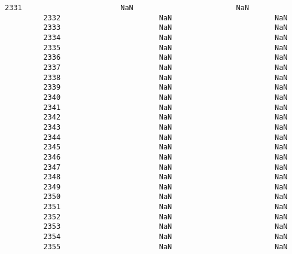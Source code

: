 \documentclass[11pt]{article}
\begin{document}
\begin{Verbatim}[commandchars=\\\{\}]
         2331                       NaN                        NaN   
         2332                       NaN                        NaN   
         2333                       NaN                        NaN   
         2334                       NaN                        NaN   
         2335                       NaN                        NaN   
         2336                       NaN                        NaN   
         2337                       NaN                        NaN   
         2338                       NaN                        NaN   
         2339                       NaN                        NaN   
         2340                       NaN                        NaN   
         2341                       NaN                        NaN   
         2342                       NaN                        NaN   
         2343                       NaN                        NaN   
         2344                       NaN                        NaN   
         2345                       NaN                        NaN   
         2346                       NaN                        NaN   
         2347                       NaN                        NaN   
         2348                       NaN                        NaN   
         2349                       NaN                        NaN   
         2350                       NaN                        NaN   
         2351                       NaN                        NaN   
         2352                       NaN                        NaN   
         2353                       NaN                        NaN   
         2354                       NaN                        NaN   
         2355                       NaN                        NaN   
         

\end{Verbatim}
\end{document}
